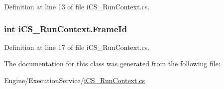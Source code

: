 Definition at line 13 of file i\+C\+S\+\_\+\+Run\+Context.\+cs.

\hypertarget{classi_c_s___run_context_a7325152d5dafb5908db84e3c1597355a}{
\subsubsection[{Frame\+Id}]{\setlength{\rightskip}{0pt plus 5cm}int i\+C\+S\+\_\+\+Run\+Context.\+Frame\+Id\hspace{0.3cm}{\ttfamily [get]}}}\label{classi_c_s___run_context_a7325152d5dafb5908db84e3c1597355a}


Definition at line 17 of file i\+C\+S\+\_\+\+Run\+Context.\+cs.



The documentation for this class was generated from the following file\+:\begin{DoxyCompactItemize}
\item 
Engine/\+Execution\+Service/\hyperlink{i_c_s___run_context_8cs}{i\+C\+S\+\_\+\+Run\+Context.\+cs}\end{DoxyCompactItemize}
